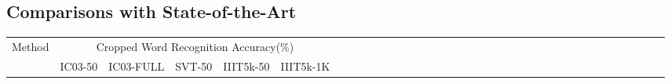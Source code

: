 \documentclass[letterpaper]{article}
\begin{document}
\subsection{Comparisons with State-of-the-Art}
 \begin{table}[tb]


\begin{multicols}{2}
\begin{minipage}[t]{0\textwidth}
\footnotesize

%
\begin{tabular}{|*{6}{l|c|c|c|c|c|}}


\hline
\multirow{2}{*}{Method}
&\multicolumn{5}{|c|}{Cropped Word Recognition Accuracy(\%)} \\
\cline{2-6}
&IC03-50
&IC03-FULL
&SVT-50
&IIIT5k-50
&IIIT5k-1K\\


\end{tabular}
\end{minipage}
\end{multicols}
\end{table}
\end{document}
